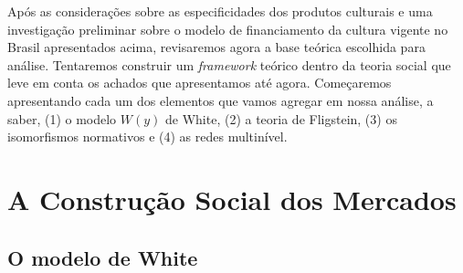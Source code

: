 \documentclass[a4paper, 12pt, openright, oneside, german, french, english, brazil]{abntex2}
\begin{document}
	Após as considerações sobre as especificidades dos produtos culturais e uma investigação preliminar sobre o modelo de financiamento da cultura vigente no Brasil apresentados acima, revisaremos agora a base teórica escolhida para análise. Tentaremos construir um \textit{framework} teórico dentro da teoria social que leve em conta os achados que apresentamos até agora. Começaremos apresentando cada um dos elementos que vamos agregar em nossa análise, a saber, (1) o modelo $W(y)$ de White, (2) a teoria de Fligstein, (3) os isomorfismos normativos e (4) as redes multinível.
	



	\chapter{A Construção Social dos Mercados}


	\section{O modelo de White}
\end{document}
